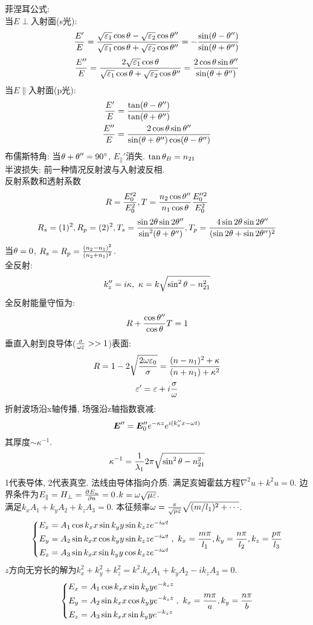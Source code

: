 \documentclass[UTF8,9pt]{ctexart}
\begin{document}
菲涅耳公式:\\
当$E\perp$入射面(s光):
\begin{equation}
    \frac{E'}{E} = \frac{\sqrt{\varepsilon_1}\cos\theta-\sqrt{\varepsilon_2}\cos\theta''}{\sqrt{\varepsilon_1}\cos\theta+\sqrt{\varepsilon_2}\cos\theta''}=-\frac{\sin(\theta-\theta'')}{\sin(\theta+\theta'')}
\end{equation}
\begin{equation}
    \frac{E''}{E} = \frac{2\sqrt{\varepsilon_1}\cos\theta}{\sqrt{\varepsilon_1}\cos\theta+\sqrt{\varepsilon_2}\cos\theta''}=\frac{2\cos\theta\sin\theta''}{\sin(\theta+\theta'')}
\end{equation}
当$E\parallel$入射面(p光):
$$\begin{aligned} 
    \frac{E'}{E}&= \frac{\tan(\theta-\theta'')}{\tan(\theta+\theta'')}\\
    \frac{E''}{E}&= \frac{2\cos\theta\sin\theta''}{\sin(\theta+\theta'')\cos(\theta-\theta'')}
 \end{aligned}$$
布儒斯特角: 当$\theta+\theta''=90^\circ$, $E_\parallel'$消失. $\tan\theta_B=n_{21}$\\
半波损失: 前一种情况反射波与入射波反相. \\
反射系数和透射系数
$$R=\frac{E_0'^2}{E_0^2}, T=\frac{n_2\cos\theta''}{n_1\cos\theta}\frac{E_0''^2}{E_0^2}$$
$$R_s=(1)^2,R_p=(2)^2,T_s=\frac{\sin2\theta\sin2\theta''}{\sin^2(\theta+\theta'')},T_p=\frac{4\sin2\theta\sin2\theta''}{(\sin2\theta+\sin2\theta'')^2}$$
当$\theta=0$, $R_s=R_p=\frac{(n_2-n_1)^2}{(n_2+n_1)^2}$. \\
全反射:
$$k_z''=i\kappa,\ \kappa=k\sqrt{\sin^2\t-n_{21}^2}$$
全反射能量守恒为:
$$R+\frac{\cos\theta''}{\cos\theta}T=1$$
垂直入射到良导体($\frac{\sigma}{\omega\varepsilon}>>1$)表面:
$$R=1-2\sqrt{\frac{2\omega\varepsilon_0}{\sigma}}=\frac{(n-n_1)^2+\kappa}{(n+n_1)+\kappa^2}$$
$$\varepsilon'=\varepsilon+i\frac{\sigma}{\omega}$$
折射波场沿x轴传播, 场强沿z轴指数衰减:
$$\bm{E}''=\bm{E}''_0e^{-\kappa z}e^{i(k''_xx-\omega t)}$$
其厚度$\sim\kappa^{-1}$.
$$\kappa^{-1}=\frac{1}{\lambda_1}{2\pi\sqrt{\sin^2\theta-n_{21}^2}}$$
1代表导体, 2代表真空. 法线由导体指向介质. 满足亥姆霍兹方程$\nabla^2u+k^2u=0$. 边界条件为$E_\parallel=H_\perp=\frac{\partial^{} E_n}{\partial {n}^{}}=0$.$k=\omega\sqrt{\mu\varepsilon}$. \\
满足$k_xA_1+k_yA_2+k_zA_3=0$. 本征频率$\omega=\frac{\pi}{\sqrt{\mu\varepsilon}}\sqrt{(m/l_1)^2+\cdots}$. 
$$\left\{\begin{aligned} 
    E_x &= A_1\cos k_xx \sin k_y y \sin k_zze^{-i\omega t}\\
    E_y &= A_2\sin k_xx \cos k_y y \sin k_zze^{-i\omega t}\\
    E_z &= A_3\sin k_xx \sin k_y y \cos k_zze^{-i\omega t}
 \end{aligned}\right.,\ k_x=\frac{m\pi}{l_1},k_y=\frac{n\pi}{l_2},k_z=\frac{p\pi}{l_3}$$
$z$方向无穷长的解为$k_x^2+k_y^2+k_z^2=k^2$.$k_xA_1+k_yA_2-ik_zA_3=0$. 
$$\left\{\begin{aligned} 
    E_x &= A_1\cos k_xx \sin k_y y e^{-k_zz}\\
    E_y &= A_2\sin k_xx \cos k_y y e^{-k_zz}\\
    E_z &= A_3\sin k_xx \sin k_y y e^{-k_zz}
 \end{aligned}\right.,\ k_x=\frac{m\pi}{a},k_y=\frac{n\pi}{b}$$
\end{document}
